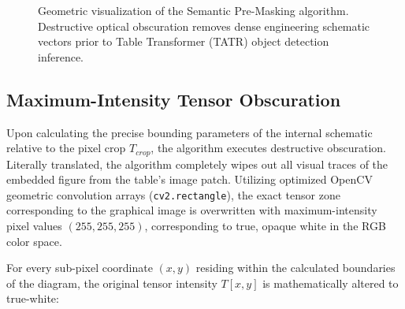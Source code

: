 \begin{figure}[htbp]
\centering
{}
\caption{Geometric visualization of the Semantic Pre-Masking algorithm. Destructive optical obscuration removes dense engineering schematic vectors prior to Table Transformer (TATR) object detection inference.}
\label{fig:semantic_masking}
\end{figure}

\subsection{Maximum-Intensity Tensor Obscuration}
Upon calculating the precise bounding parameters of the internal schematic relative to the pixel crop $T_{crop}$, the algorithm executes destructive obscuration. Literally translated, the algorithm completely wipes out all visual traces of the embedded figure from the table's image patch. Utilizing optimized OpenCV \citep{opencv} geometric convolution arrays (\texttt{cv2.rectangle}), the exact tensor zone corresponding to the graphical image is overwritten with maximum-intensity pixel values $(255, 255, 255)$, corresponding to true, opaque white in the RGB color space. 

For every sub-pixel coordinate $(x, y)$ residing within the calculated boundaries of the diagram, the original tensor intensity $T[x,y]$ is mathematically altered to true-white:

